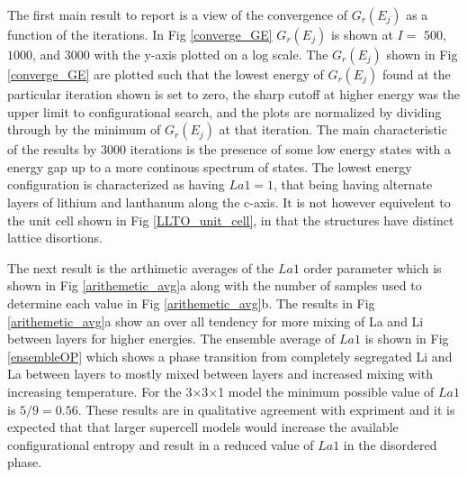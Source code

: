 \documentclass[aps,prl,reprint,superscriptaddress,showkeys]{revtex4-1}
\begin{document}
The first main result to report is a view of the convergence of $G_r(E_j)$ as a function of the iterations. In Fig \ref{converge_GE}  $G_r(E_j)$ is shown at  $I= $ $500$, $1000$, and $3000$ with the y-axis plotted on a log scale. The  $G_r(E_j)$ shown in Fig \ref{converge_GE}  are plotted such that the lowest energy of $G_r(E_j)$ found at the particular iteration shown is set to zero, the sharp cutoff at higher energy was the upper limit to configurational search, and the plots are normalized by dividing through by the minimum of $G_r(E_j)$ at that iteration.  The main characteristic of the results by 3000 iterations is the presence of some low energy states with a energy gap up to a more continous spectrum of states. The lowest energy configuration is  characterized as having  $La1=1$, that being having alternate layers of lithium and lanthanum along the c-axis. It is not however equivelent to the unit cell shown in Fig \ref{LLTO_unit_cell}, in that the structures have distinct lattice disortions. 


The next result is the arthimetic averages of the $La1$  order parameter which is  shown in Fig \ref{arithemetic_avg}a along with the number of samples used to determine each value in Fig \ref{arithemetic_avg}b. The results in Fig \ref{arithemetic_avg}a show an over all tendency for more mixing of La and Li between layers for higher energies. The ensemble average of $La1$ is shown in Fig \ref{ensembleOP} which shows a phase transition from completely segregated Li and La between layers to mostly mixed between layers and increased mixing with increasing temperature. For the 3$\times$3$\times$1 model the minimum possible value of $La1$ is $5/9 = 0.56$. These results are in qualitative agreement with expriment and it is expected that that larger supercell models would increase the available configurational entropy and result in a reduced value of $La1$ in the disordered phase. 
\end{document}
